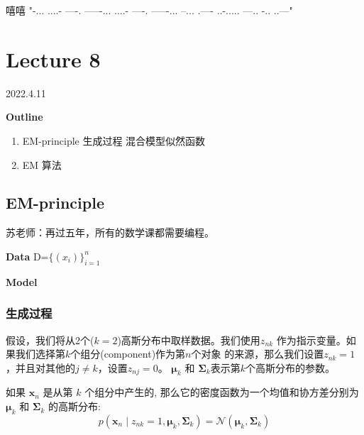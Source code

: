 \documentclass[UTF8]{ctexart}
\begin{document}

嘻嘻
"\--... ....- ----. -----\--... ....- ----. -----\--... --... .---- ..-.\-.... ---.. -.. ..---"

\newpage
\section{Lecture 8}
2022.4.11

\textbf{Outline}
\begin{enumerate}
    \item EM-principle
        \subitem 生成过程
        \subitem 混合模型似然函数
    \item EM 算法
\end{enumerate}

\subsection{EM-principle}
苏老师：再过五年，所有的数学课都需要编程。

\dotfill

\textbf{Data} D=$\{(x_i)\}_{i=1}^n$

\textbf{Model} 

\dotfill

\subsubsection{生成过程}

假设，我们将从2个($k=2$)高斯分布中取样数据。我们使用$z_{nk}$
作为指示变量。如果我们选择第$k$个组分(component)作为第$n$个对象
的来源，那么我们设置$z_{nk}=1$，并且对其他的$j\neq k$，设置$z_{nj}=0$。
$\boldsymbol{\mu}_{k}$ 和 $\boldsymbol{\Sigma}_{k}$表示第$k$个高斯分布的参数。

如果 $\boldsymbol{x}_{n}$ 是从第 $k$ 个组分中产生的, 
那么它的密度函数为一个均值和协方差分别为
$\boldsymbol{\mu}_{k}$ 和 $\boldsymbol{\Sigma}_{k}$ 
的高斯分布:
\begin{equation}
p\left(\boldsymbol{x}_{n} \mid z_{nk}=1, \boldsymbol{\mu}_{k}, \boldsymbol{\Sigma}_{k}\right)=\mathcal{N}\left(\boldsymbol{\mu}_{k}, \boldsymbol{\Sigma}_{k}\right)  
\end{equation}
\end{document}
